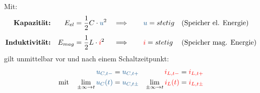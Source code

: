 \begin{frame}
{    Mit:
    \begin{align}
        \textbf{Kapazität:}     && E_{el}  &= \frac{1}{2} C \cdot \ecv{u}^2  &&\Longrightarrow\qquad \ecv{u} = stetig && \text{(Speicher el. Energie)} \\[+4pt]
        \textbf{Induktivität:}  && E_{mag} &= \frac{1}{2} L \cdot \eci{i}^2  &&\Longrightarrow\qquad \eci{i} = stetig && \text{(Speicher mag. Energie)}
    \end{align}%
    \pause%
    gilt unmittelbar vor und nach einem Schaltzeitpunkt:
    \begin{align}
        \ecv{u_{C,t-}} &= \ecv{u_{C,t+}} & 
        \eci{i_{L,t-}} &= \eci{i_{L,t+}} \\
        \text{mit}\quad 
        \lim_{\pm\infty \rightarrow t} \ecv{u_C(t)} &= \ecv{u_{C,t\pm}} & 
        \lim_{\pm\infty \rightarrow t} \eci{i_L(t)} &= \eci{i_{L,t\pm}}
    \end{align}
    
}
\end{frame}

